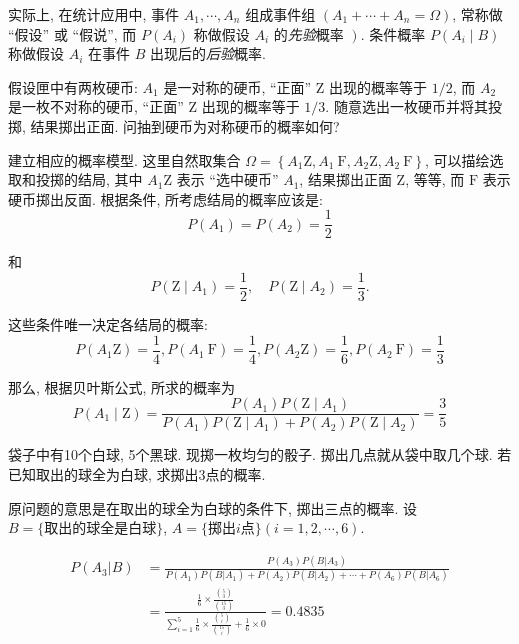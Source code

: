     实际上, 在统计应用中, 事件 $A_1, \cdots, A_n$ 组成事件组 $\left(A_1+\cdots+A_n=\Omega\right)$, 常称做 ``假设'' 或 ``假说'', 而 $P\left(A_i\right)$ 称做假设 $A_i$ 的\emph{先验}概率 $\left.\right)$. 条件概率 $P\left(A_i \mid B\right)$ 称做假设 $A_i$ 在事件 $B$ 出现后的\emph{后验}概率. 


\begin{exercise}
    假设匣中有两枚硬币: $A_1$ 是一对称的硬币, ``正面'' $\mathrm{Z}$ 出现的概率等于 $1 / 2$, 而 $A_2$ 是一枚不对称的硬币, ``正面'' $\mathrm{Z}$ 出现的概率等于 $1 / 3$. 随意选出一枚硬币并将其投掷, 结果掷出正面. 问抽到硬币为对称硬币的概率如何?
\end{exercise}

\begin{solution}
    建立相应的概率模型. 这里自然取集合 $\Omega=\left\{A_1 \mathrm{Z}, A_1 \mathrm{~F}, A_2 \mathrm{Z}, A_2 \mathrm{~F}\right\}$, 可以描绘选取和投掷的结局, 其中 $A_1 \mathrm{Z}$ 表示 ``选中硬币'' $A_1$, 结果掷出正面 $\mathrm{Z}$, 等等, 而 $\mathrm{F}$ 表示硬币掷出反面. 根据条件, 所考虑结局的概率应该是:
$$
P\left(A_1\right)=P\left(A_2\right)=\frac{1}{2}
$$

和
$$
P\left(\mathrm{Z} \mid A_1\right)=\frac{1}{2}, \quad P\left(\mathrm{Z} \mid A_2\right)=\frac{1}{3} .
$$

这些条件唯一决定各结局的概率:
$$
P\left(A_1 \mathrm{Z}\right)=\frac{1}{4}, P\left(A_1 \mathrm{~F}\right)=\frac{1}{4}, P\left(A_2 \mathrm{Z}\right)=\frac{1}{6}, P\left(A_2 \mathrm{~F}\right)=\frac{1}{3}
$$

那么, 根据贝叶斯公式, 所求的概率为
$$
P\left(A_1 \mid \mathrm{Z}\right)=\frac{P\left(A_1\right) P\left(\mathrm{Z} \mid A_1\right)}{P\left(A_1\right) P\left(\mathrm{Z} \mid A_1\right)+P\left(A_2\right) P\left(\mathrm{Z} \mid A_2\right)}=\frac{3}{5}
$$
\end{solution}

\begin{exercise}
    袋子中有10个白球, 5个黑球. 现掷一枚均匀的骰子. 掷出几点就从袋中取几个球. 若已知取出的球全为白球, 求掷出3点的概率. 
\end{exercise}

\begin{solution}
    原问题的意思是在取出的球全为白球的条件下, 掷出三点的概率. 设$B=\{\text{取出的球全是白球}\}$, $A=\{\text{掷出}i\text{点}\}(i=1,2,\cdots, 6)$.

    \begin{align*}
        P(A_3 | B) &= \frac{P(A_3)P(B|A_3)}{P(A_1)P(B|A_1)+P(A_2)P(B|A_2)+\cdots+P(A_6)P(B|A_6)} \\
        &= \frac{\frac16 \times \frac{\binom 53}{\binom {15}3}}{\sum_{i=1}^5 \frac16\times \frac{\binom 5i}{\binom{15}i}+\frac16\times 0}=0.4835
    \end{align*}
\end{solution}


